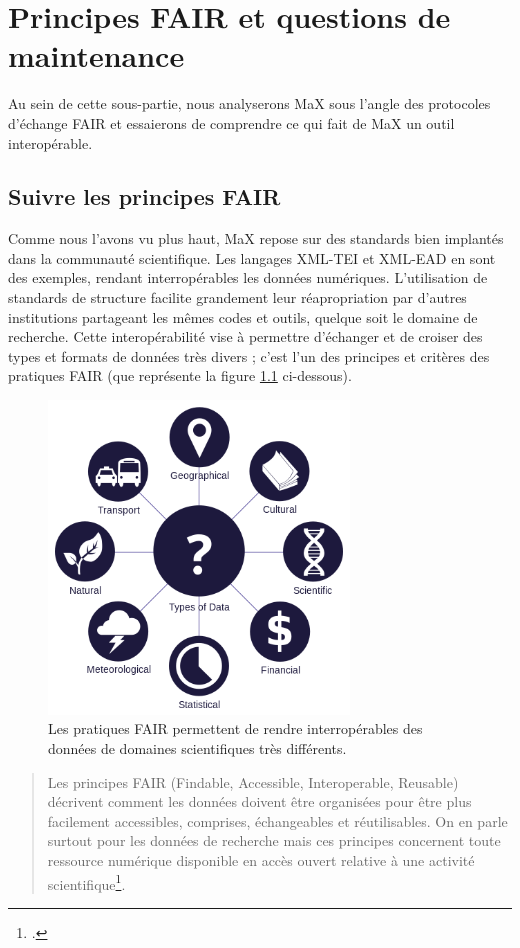 \documentclass[a4paper,12pt,twoside]{book}
\begin{document}
\chapter{Principes FAIR et questions de maintenance}
Au sein de cette sous-partie, nous analyserons MaX sous l'angle des protocoles d'échange FAIR et essaierons de comprendre ce qui fait de MaX un outil interopérable.

\section{Suivre les principes FAIR}
Comme nous l'avons vu plus haut, MaX repose sur des standards bien implantés dans la communauté scientifique. Les langages XML-TEI et XML-EAD en sont des exemples, rendant interropérables les données numériques. L'utilisation de standards de structure facilite grandement leur réapropriation par d'autres institutions partageant les mêmes codes et outils,  quelque soit le domaine de recherche. Cette interopérabilité vise à permettre d'échanger et de croiser des types et formats de données très divers ; c'est l'un des principes et critères des pratiques FAIR (que représente la figure \ref{echange} ci-dessous).


\begin{figure}[H]
    \centering
    \includegraphics[width=8cm]{img/partie_2/Data_types.png}
    \caption{Les pratiques FAIR permettent de rendre interropérables des données de domaines scientifiques très différents.}
    \label{echange}
\end{figure}

\begin{quote}
    Les principes FAIR (Findable, Accessible, Interoperable, Reusable) décrivent comment les données doivent être organisées pour être plus facilement accessibles, comprises, échangeables et réutilisables. On en parle surtout pour les données de recherche mais ces principes concernent toute ressource numérique disponible en accès ouvert relative à une activité scientifique\footcite{FAIR}.
\end{quote}
\end{document}
